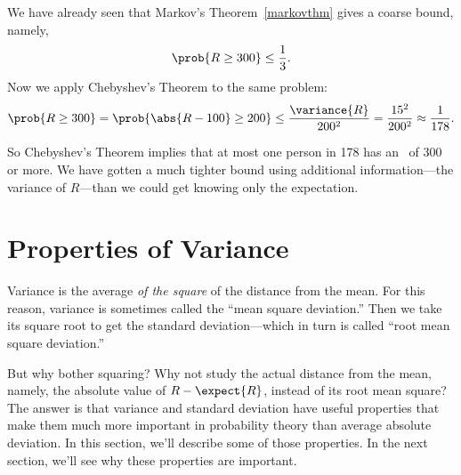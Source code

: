 We have already seen that Markov's Theorem~\ref{markovthm} gives a coarse
bound, namely,
\[
  \prob{R \geq 300} \leq \frac{1}{3}.
\]
Now we apply Chebyshev's Theorem to the same problem:
\[
\prob{R \geq 300} = \prob{\abs{R - 100} \geq 200} \leq
\frac{\variance{R}}{200^2} = \frac{15^2}{200^2} \approx \frac{1}{178}.
\]
\iffalse
The purpose of the first step is to express the desired probability in the
form required by Chebyshev's Theorem; the equality holds because $R$ is
nonnegative.  Chebyshev's Theorem then yields the inequality.\fi

So Chebyshev's Theorem implies that at most one person in 178
has an \IQ\ of 300 or more.  We have gotten a much tighter bound using
additional information---the variance of $R$---than we could get
knowing only the expectation.

\begin{problems}
\examproblems
{}
\end{problems}

\section{Properties of Variance}\label{variance_sec}
Variance is the average \emph{of the square} of the distance from the
mean.  For this reason, variance is sometimes called the ``mean square
deviation.''  Then we take its square root to get the standard
deviation---which in turn is called ``root mean square deviation.''

But why bother squaring?  Why not study the actual distance from the
mean, namely, the absolute value of $R - \expect{R}$, instead of its
root mean square?  The answer is that variance and standard
deviation have useful properties that make them much more important in
probability theory than average absolute deviation.  In this section,
we'll describe some of those properties.  In the next section, we'll
see why these properties are important.

\iffalse
Focus on the variance and standard deviation of $R$ may seem a little
unexpected.  After all, these definitions arose from asking about the
probability that the absolute deviation, $\abs{R - \expect{R}}$, was
large.  To get a better grip on the probability of deviation, we
squared it to get the Chebyshev Bound, this led us to the convoluted
concept of root mean square deviation.
\fi

